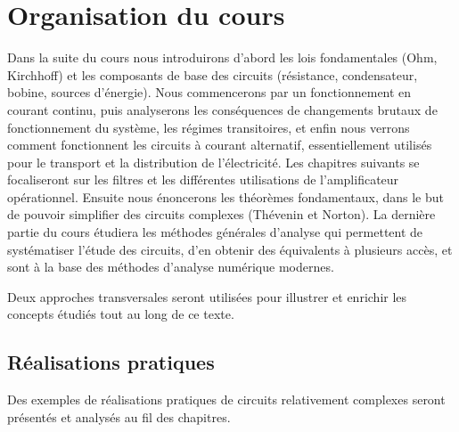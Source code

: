 \section{Organisation du cours}

Dans la suite du cours nous introduirons d'abord les lois fondamentales (Ohm, Kirchhoff) et les composants de base des circuits (résistance, condensateur, bobine, sources d'énergie). Nous commencerons par un fonctionnement en courant continu, puis analyserons les conséquences de changements brutaux de fonctionnement du système, les régimes transitoires, et enfin nous verrons comment fonctionnent les circuits à courant alternatif, essentiellement utilisés pour le transport et la distribution de l'électricité. 
Les chapitres suivants se focaliseront sur les filtres et les différentes utilisations de l'amplificateur opérationnel.
Ensuite nous énoncerons les théorèmes fondamentaux, dans le but de pouvoir simplifier des circuits complexes (Thévenin et Norton). La dernière partie du cours étudiera les méthodes générales d'analyse qui permettent de systématiser l'étude des circuits, d'en obtenir des équivalents à plusieurs accès, et sont à la base des méthodes d'analyse numérique modernes.

Deux approches transversales seront utilisées pour illustrer et enrichir les concepts étudiés tout au long de ce texte.

\subsection{Réalisations pratiques} 
\label{sec:pratique}
Des exemples de réalisations pratiques de circuits relativement complexes seront présentés et analysés au fil des chapitres. 

